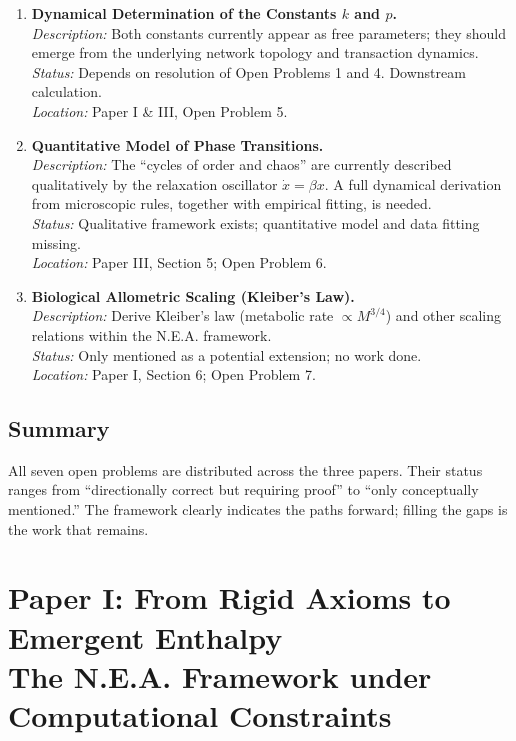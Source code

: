 \documentclass{article}
\begin{document}
\begin{enumerate}
    \item \textbf{Dynamical Determination of the Constants \(k\) and \(p\).} \\
    \textit{Description:} Both constants currently appear as free parameters; they should emerge from the underlying network topology and transaction dynamics. \\
    \textit{Status:} Depends on resolution of Open Problems 1 and 4. Downstream calculation. \\
    \textit{Location:} Paper I \& III, Open Problem 5.

    \item \textbf{Quantitative Model of Phase Transitions.} \\
    \textit{Description:} The “cycles of order and chaos” are currently described qualitatively by the relaxation oscillator \(\dot{x} = \beta x\). A full dynamical derivation from microscopic rules, together with empirical fitting, is needed. \\
    \textit{Status:} Qualitative framework exists; quantitative model and data fitting missing. \\
    \textit{Location:} Paper III, Section 5; Open Problem 6.

    \item \textbf{Biological Allometric Scaling (Kleiber’s Law).} \\
    \textit{Description:} Derive Kleiber’s law (metabolic rate \(\propto M^{3/4}\)) and other scaling relations within the N.E.A. framework. \\
    \textit{Status:} Only mentioned as a potential extension; no work done. \\
    \textit{Location:} Paper I, Section 6; Open Problem 7.
\end{enumerate}

\subsection*{Summary}

All seven open problems are distributed across the three papers. Their status ranges from “directionally correct but requiring proof” to “only conceptually mentioned.” The framework clearly indicates the paths forward; filling the gaps is the work that remains.

\newpage

\section*{Paper I: From Rigid Axioms to Emergent Enthalpy\\
\large The N.E.A. Framework under Computational Constraints}
\vspace{0.5cm}
\end{document}
